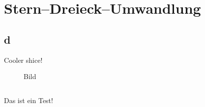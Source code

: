 %
%
%
%
\chapter{Stern--Dreieck--Umwandlung}\label{ex:einsinnvolleslabel}
%
%
\section{d}\label{sec:einsinnvolleslabel}
%
Cooler shice!

\begin{figure}[htb]
%

\caption{Bild}
%
\end{figure}

%
%
%
\section{}\label{sec:einsinnvolleslabel1}
%
Das ist ein Test!
%
\clearpage
